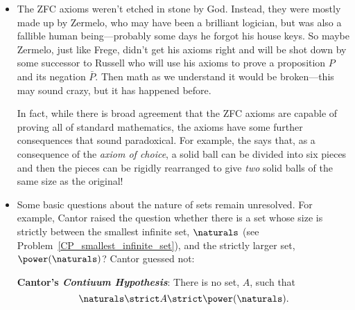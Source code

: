 %
\begin{itemize}

\item The ZFC axioms weren't etched in stone by God.  Instead,
  they were mostly made up by Zermelo, who may have been a brilliant
  logician, but was also a fallible human being---probably some days
  he forgot his house keys.  So maybe Zermelo, just like Frege, didn't
  get his axioms right and will be shot down by some successor to
  Russell%
who will use his axioms to prove a proposition $P$ and
  its negation $\bar{P}$.  Then math as we understand it would be
  broken---this may sound crazy, but it has happened before.

  In fact, while there is broad agreement that the ZFC axioms are
  capable of proving all of standard mathematics, the axioms have some
  further consequences that sound paradoxical.  For example, the
   says that, as a consequence of the
  \emph{axiom of choice}, a solid
  ball can be divided into six pieces and then the pieces can be
  rigidly rearranged to give \emph{two} solid balls of the same size
  as the original!

\item Some basic questions about the nature of sets remain unresolved.
  For example, Cantor raised the question whether there is a set whose
  size is strictly between the smallest infinite set, $\naturals$ (see
  Problem~\ref{CP_smallest_infinite_set}), and the strictly larger
  set, $\power(\naturals)$?  Cantor guessed not:

  \textbf{Cantor's \emph{Contiuum
      Hypothesis}}: There is no set, $A$, such that
  \[
  \naturals \strict A \strict \power(\naturals).
  \]


\end{itemize}
